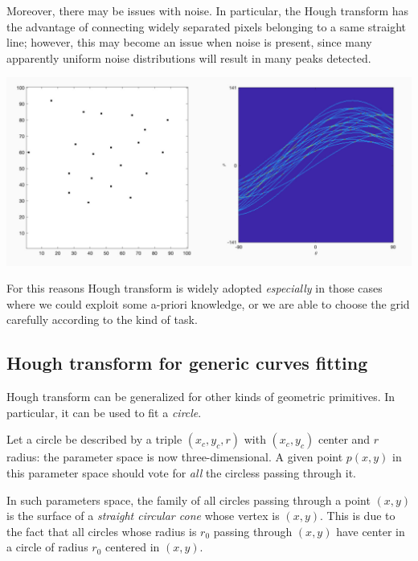 \documentclass[10pt]{report}
\begin{document}
Moreover, there may be issues with noise. In particular, the Hough
transform has the advantage of connecting widely separated pixels
belonging to a same straight line; however, this may become an issue
when noise is present, since many apparently uniform noise distributions
will result in many peaks detected.

\begin{center}
\includegraphics[width=.9\linewidth]{./pics/fit/hough-counterexample.jpg}
\end{center}

For this reasons Hough transform is widely adopted \emph{especially} in those
cases where we could exploit some a-priori knowledge, or we are able to
choose the grid carefully according to the kind of task.

\subsection{Hough transform for generic curves fitting}
\label{sec:orgb309e34}
Hough transform can be generalized for other kinds of geometric
primitives. In particular, it can be used to fit a \emph{circle}.

Let a circle be described by a triple \((x_c, y_c, r)\) with
\((x_c,y_c)\) center and \(r\) radius: the parameter space is now
three-dimensional. A given point \(p(x,y)\) in this parameter space
should vote for \emph{all} the circless passing through it.

In such parameters space, the family of all circles passing through a
point \((x, y)\) is the surface of a \emph{straight circular cone} whose
vertex is \((x, y)\). This is due to the fact that all circles whose
radius is \(r_0\) passing through \((x, y)\) have center in a circle of
radius \(r_0\) centered in \((x, y)\).
\end{document}
